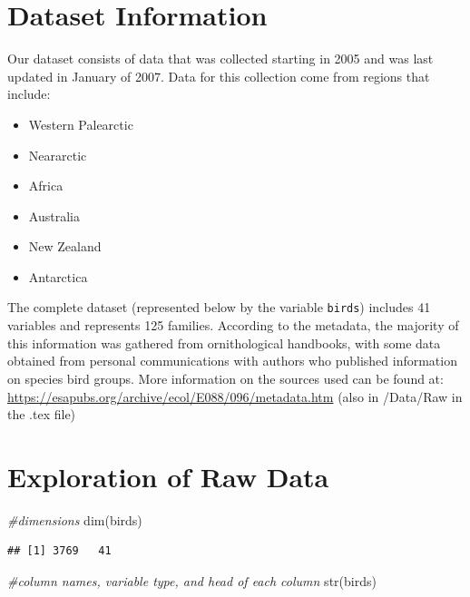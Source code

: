 \documentclass[
  12pt,
]{article}
\newenvironment{Shaded}{\begin{snugshade}}{\end{snugshade}}
\newcommand{\CommentTok}[1]{\textcolor[rgb]{0.56,0.35,0.01}{\textit{#1}}}
\newcommand{\FunctionTok}[1]{\textcolor[rgb]{0.00,0.00,0.00}{#1}}
\newcommand{\NormalTok}[1]{#1}
\providecommand{\tightlist}{%
  \setlength{\itemsep}{0pt}\setlength{\parskip}{0pt}}
\begin{document}
\hypertarget{dataset-information}{%
\section{Dataset Information}\label{dataset-information}}

Our dataset consists of data that was collected starting in 2005 and was
last updated in January of 2007. Data for this collection come from
regions that include:

\begin{itemize}
\tightlist
\item
  Western Palearctic
\item
  Neararctic
\item
  Africa
\item
  Australia
\item
  New Zealand
\item
  Antarctica
\end{itemize}

The complete dataset (represented below by the variable \texttt{birds})
includes 41 variables and represents 125 families. According to the
metadata, the majority of this information was gathered from
ornithological handbooks, with some data obtained from personal
communications with authors who published information on species bird
groups. More information on the sources used can be found at:
\url{https://esapubs.org/archive/ecol/E088/096/metadata.htm} (also in
/Data/Raw in the .tex file)

\newpage

\hypertarget{exploration-of-raw-data}{%
\section{Exploration of Raw Data}\label{exploration-of-raw-data}}

\begin{Shaded}
\begin{Highlighting}[]
\CommentTok{\#dimensions}
\FunctionTok{dim}\NormalTok{(birds)}
\end{Highlighting}
\end{Shaded}

\begin{verbatim}
## [1] 3769   41
\end{verbatim}

\begin{Shaded}
\begin{Highlighting}[]
\CommentTok{\#column names, variable type, and head of each column}
\FunctionTok{str}\NormalTok{(birds)}
\end{Highlighting}
\end{Shaded}
\end{document}
